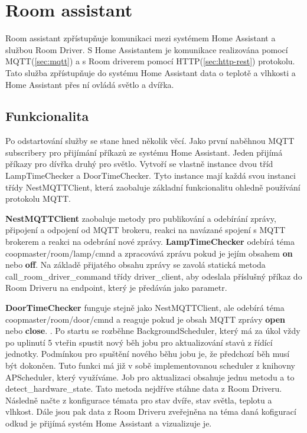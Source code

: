 \section{Room assistant}\label{sec:room-assistant}
Room assistant zpřístupňuje komunikaci mezi systémem Home Assistant a službou Room Driver.\newline
S Home Assistantem je komunikace realizována pomocí MQTT(\ref{sec:mqtt}) a s Room driverem pomocí HTTP(\ref{sec:http-rest}) protokolu.
Tato služba zpřístupňuje do systému Home Assistant data o teplotě a vlhkosti a Home Assistant přes ní ovládá světlo a dvířka.

\subsection*{Funkcionalita}
Po odstartování služby se stane hned několik věcí.
Jako první naběhnou MQTT subscribery pro přijímání příkazů ze systému Home Assistant.
Jeden přijímá příkazy pro dívřka druhý pro světlo.
Vytvoří se vlastně instance dvou tříd LampTimeChecker a DoorTimeChecker.
Tyto instance mají každá svou instanci třídy NestMQTTClient, která zaobaluje základní funkcionalitu ohledně používání protokolu MQTT.\newline

\textbf{NestMQTTClient} zaobaluje metody pro publikování a odebírání zprávy, připojení a odpojení od MQTT brokeru, reakci na navázané spojení s MQTT brokerem a reakci na odebrání nové zprávy.\newline
\textbf{LampTimeChecker} odebírá téma coopmaster/room/lamp/cmnd a zpracovává zprávu pokud je jejím obsahem \textbf{on} nebo \textbf{off}.
Na základě přijatého obsahu zprávy se zavolá statická metoda call\_room\_driver\_command třídy driver\_client, aby odeslala příslušný příkaz do Room Driveru na endpoint, který je předáván jako parametr.

\textbf{DoorTimeChecker} funguje stejně jako NestMQTTClient, ale odebírá téma coopmaster/room/door/cmnd a reaguje pokud je obsah MQTT zprávy \textbf{open} nebo \textbf{close}.
.\newline
Po startu se rozběhne BackgroundScheduler, který má za úkol vždy po uplinutí 5 vteřin spustit nový běh jobu pro aktualizování stavů z řídící jednotky.
Podmínkou pro spuštění nového běhu jobu je, že předchozí běh musí být dokončen.
Tuto funkci má již v sobě implementovanou scheduler z knihovny APScheduler, který využíváme.
Job pro aktualizaci obsahuje jednu metodu a to detect\_hardware\_state.
Tato metoda nejdříve stáhne data z Room Driveru.
Následně načte z konfigurace témata pro stav dvíře, stav světla, teplotu a vlhkost.
Dále jsou pak data z Room Driveru zveřejněna na téma daná kofigurací odkud je přijímá systém Home Assistant a vizualizuje je.

